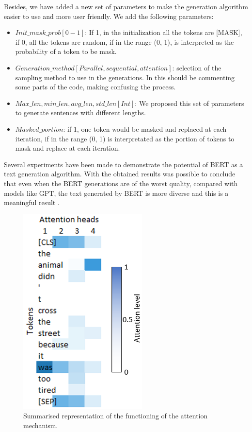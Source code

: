 \documentclass[10pt,twocolumn,letterpaper]{article}
\begin{document}
Besides, we have added a new set of parameters to make the generation algorithm easier to use and more user friendly. We add the following parameters:
\begin{itemize}
   \item $ Init\_mask\_prob [0 - 1] $: If 1, in the initialization all the tokens are [MASK], if 0, all the tokens are random,
   if in the range (0, 1), is interpreted as the probability of a token to be mask.
   \item $ Generation\_method [Parallel, sequential, attention] $: selection of the sampling method to use in the generations.
   In \cite{wang2019bert} this should be commenting some parts of the code, making confusing the process.
   \item $ Max\_len, min\_len, avg\_len, std\_len [Int] $: We proposed this set of parameters to generate sentences with different lengths.
   \item $ Masked\_portion $: if 1, one token would be masked and replaced at each iteration, if in the range (0, 1)
   is interpretated as the portion of tokens to mask and replace at each iteration.
\end{itemize}

Several experiments have been made to demonstrate the potential of BERT as a text generation algorithm.
With the obtained results was possible to conclude that even when the BERT generations are of the worst quality,
compared with models like GPT, the text generated by BERT is more diverse and this is a meaningful result \cite{wang2019bert}.

\begin{figure}[t]
   \centering
   \includegraphics[scale=0.8]{attentionPlot.PNG}
   \caption{Summarised representation of the functioning of the attention mechanism.}
   \label{fig:AttentFig}
\end{figure}
\end{document}
